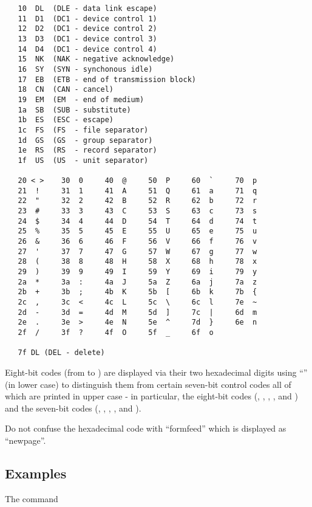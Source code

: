 \begin{itemize}
\begin{verbatim}
   10  DL  (DLE - data link escape)
   11  D1  (DC1 - device control 1)
   12  D2  (DC1 - device control 2)
   13  D3  (DC1 - device control 3)
   14  D4  (DC1 - device control 4)
   15  NK  (NAK - negative acknowledge)
   16  SY  (SYN - synchonous idle)
   17  EB  (ETB - end of transmission block)
   18  CN  (CAN - cancel)
   19  EM  (EM  - end of medium)
   1a  SB  (SUB - substitute)
   1b  ES  (ESC - escape)
   1c  FS  (FS  - file separator)
   1d  GS  (GS  - group separator)
   1e  RS  (RS  - record separator)
   1f  US  (US  - unit separator)

   20 < >    30  0     40  @     50  P     60  `     70  p
   21  !     31  1     41  A     51  Q     61  a     71  q
   22  "     32  2     42  B     52  R     62  b     72  r
   23  #     33  3     43  C     53  S     63  c     73  s
   24  $     34  4     44  D     54  T     64  d     74  t
   25  %     35  5     45  E     55  U     65  e     75  u
   26  &     36  6     46  F     56  V     66  f     76  v
   27  '     37  7     47  G     57  W     67  g     77  w
   28  (     38  8     48  H     58  X     68  h     78  x
   29  )     39  9     49  I     59  Y     69  i     79  y
   2a  *     3a  :     4a  J     5a  Z     6a  j     7a  z
   2b  +     3b  ;     4b  K     5b  [     6b  k     7b  {
   2c  ,     3c  <     4c  L     5c  \     6c  l     7e  ~
   2d  -     3d  =     4d  M     5d  ]     7c  |     6d  m
   2e  .     3e  >     4e  N     5e  ^     7d  }     6e  n
   2f  /     3f  ?     4f  O     5f  _     6f  o

   7f DL (DEL - delete)
\end{verbatim}

   Eight-bit codes (from  to ) are displayed via their two
   hexadecimal digits using ``'' (in lower case) to distinguish
   them from certain seven-bit control codes all of which are printed in upper
   case - in particular, the eight-bit codes (, , ,
   , and ) and the seven-bit codes (, ,
   , , and ).

   Do not confuse the hexadecimal code  with ``formfeed'' which is
   displayed as  ``newpage''.
\end{itemize}

\subsection*{Examples}

The command


